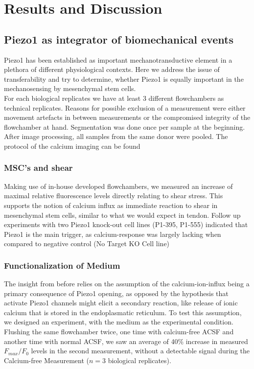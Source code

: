 \chapter{Results and Discussion}

\section{Piezo1 as integrator of biomechanical events}
Piezo1 has been established as important mechanotransductive element \cite{Murthy2017PiezosTU}  in a plethora of different physiological contexts. Here we address the issue of transferability and try to determine, whether Piezo1 is equally important in the mechanosensing by mesenchymal stem cells.\\
For each biological replicates we have at least 3 different flowchambers as technical replicates. Reasons for possible exclusion of a measurement were either movement artefacts in between measurements or the compromised integrity of the flowchamber at hand. Segmentation was done once per sample at the beginning. After image processing, all samples from the same donor were pooled. The protocol of the calcium imaging can be found \\

\subsection{MSC's and shear}
Making use of in-house developed flowchambers, we measured an increase of maximal relative fluorescence levels directly relating to shear stress. This supports the notion of calcium influx as immediate reaction to shear in mesenchymal stem cells, similar to what we would expect in tendon. Follow up experiments with two Piezo1 knock-out cell lines (P1-395, P1-555) indicated that Piezo1 is the main trigger, as calcium-response was largely lacking when compared to negative control (No Target KO Cell line) \\ 

\subsection{Functionalization of Medium}
The insight from before relies on the assumption of the calcium-ion-influx being a primary consequence of Piezo1 opening, as opposed by the hypothesis that activate Piezo1 channels might elicit a secondary reaction, like release of ionic calcium that is stored in the endoplasmatic reticulum. To test this assumption, we designed an experiment, with the medium as the experimental condition.\\
Flushing the same flowchamber twice, one time with calcium-free ACSF and another time with normal ACSF, we saw an average of 40\% increase in measured $F_{max}/F_{0}$ levels in the second measurement, without a detectable signal during the Calcium-free Measurement ($n=3$ biological replicates).\par

